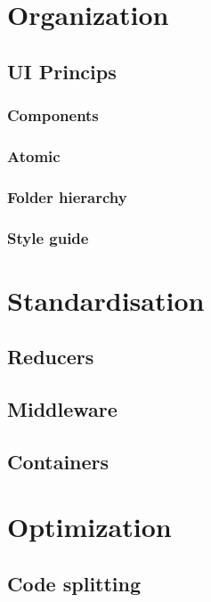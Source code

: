 \tableofcontents
\pagebreak

\chapter{Organization}
	\section{UI Princips}
		\subsection{Components}
		\subsection{Atomic}
		\subsection{Folder hierarchy}
		\subsection{Style guide}

\chapter{Standardisation}


	

	\section{Reducers}

	\section{Middleware}

	\section{Containers}

\chapter{Optimization}

	\section{Code splitting}

